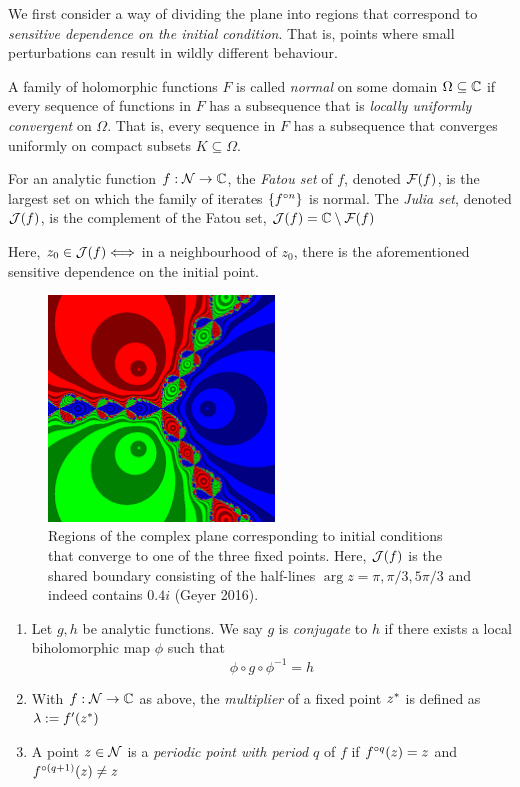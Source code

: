 \documentclass[../main.tex]{subfiles}
\begin{document}
We first consider a way of dividing the plane into regions that correspond to \emph{sensitive dependence on the initial condition}. That is, points where small perturbations can result in wildly different behaviour.

\begin{dfn}
    \label{intro:dfn:fj}
    A family of holomorphic functions $F$ is called \emph{normal} on some domain $\Omega \subseteq \mathbb{C}$ if every sequence of functions in $F$ has a subsequence that is \emph{locally uniformly convergent} on $\Omega$. That is, every sequence in $F$ has a subsequence that converges uniformly on compact subsets $K \subseteq \Omega$.
\end{dfn}

\begin{dfn}
    For an analytic function $f:\mathcal{N} \to \mathbb{C}$, the \emph{Fatou set} of $f$, denoted $\mathcal{F}(f)$, is the largest set on
    which the family of iterates $\left\{f^{\circ n}\right\}$ is normal. The \emph{Julia set}, denoted $\mathcal{J}(f)$, is the complement of the Fatou set, $\mathcal{J}(f) = \mathbb{C}\setminus\mathcal{F}(f)$
\end{dfn}

Here, $z_0 \in \mathcal{J}(f) \Longleftrightarrow$ in a neighbourhood of $z_0$, there is the aforementioned sensitive dependence on the initial point.

\begin{figure}
    \label{fig:Julia of example}
    \centering
    \includegraphics[width=6cm]{resources/ch-11/Juliaex.png}
    \caption{Regions of the complex plane corresponding to initial conditions that converge to one of the three fixed points. Here, $\mathcal{J}(f)$ is the shared boundary consisting of the half-lines $\arg{z} = \pi, \pi/3, 5\pi/3$ and indeed contains $0.4i$ (Geyer 2016).}
\end{figure}

\begin{dfn}
\begin{enumerate}
    \item Let $g, h$ be analytic functions. We say $g$ is \emph{conjugate} to $h$ if there exists a local biholomorphic map $\phi$ such that
    \[
    \phi \circ g \circ \phi^{-1} = h
    \]
    \item With $f : \mathcal{N} \to \mathbb{C}$ as above, the \emph{multiplier} of a fixed point $z^*$ is defined as $\lambda := f^{\prime}(z^*)$
    \item A point $z \in \mathcal{N}$ is a \emph{periodic point with period $q$} of $f$ if $f^{\circ q}(z) = z$ and $f^{\circ(q+1)}(z) \neq z$
\end{enumerate}
\end{dfn}
\end{document}
